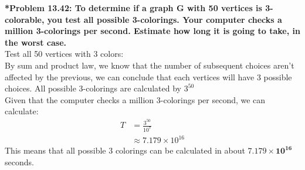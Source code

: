 \documentclass{article}
\begin{document}
    \noindent \textbf{*Problem 13.42: To determine if a graph G with 50 vertices is 3-colorable, you test all possible 3-colorings. Your computer checks a million 3-colorings per second. Estimate how long it is going to take, in the worst case.}
    \\ Test all 50 vertices with 3 colors:
    \\ By sum and product law, we know that the number of subsequent choices aren't affected by the previous, we can conclude that each vertices will have 3 possible choices. All possible 3-colorings are calculated by $3^{50}$
    \\ Given that the computer checks a million 3-colorings per second, we can calculate:
    \begin{align*}
        T &= \frac{3^{50}}{10^7}\\
        & \approx 7.179 \times 10^{16}
    \end{align*}
    \noindent This means that all possible 3 colorings can be calculated in about {\LARGE $\boxed{\mathbf{7.179 \times 10^{16}}}$} seconds.
    
\end{document}
